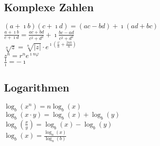     \subsection{Komplexe Zahlen}
        $(a+\imath b)(c+\imath d)=(ac-bd)+\imath(ad+bc)$ \\
        $\displaystyle\frac{a+\imath b}{c+\imath d}=\frac{ac+bd}{c^2+d^2}+\imath\frac{bc-ad}{c^2+d^2}$ \\
        $\displaystyle \sqrt[n]{z}=\sqrt[n]{|z|}\cdot e^{\imath\left(\frac{\varphi}{n}+\frac{2\pi k}{n}\right)}$ \\
        $z^n=r^ne^{\imath n\varphi}$ \\
        $\frac{1}{\imath} = -\imath$
    \subsection{Logarithmen}
        $\log_b(x^n) = n\log_b(x)$ \\
        $\log_b(x\cdot y) = \log_b(x) + \log_b(y)$ \\
        $\log_b(\frac{x}{y}) = \log_b(x) - \log_b(y)$ \\
        $\log_b(x) = \frac{\log_n(x)}{\log_n(b)}$
